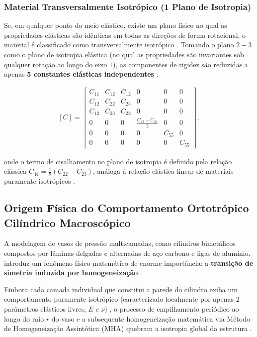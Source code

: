 \subsubsection{Material Transversalmente Isotrópico (1 Plano de Isotropia)}
Se, em qualquer ponto do meio elástico, existe um plano físico no qual as propriedades elásticas são idênticas em todas as direções de forma rotacional, o material é classificado como transversalmente isotrópico \cite{lai2010continuum}. Tomando o plano $2-3$ como o plano de isotropia elástica (no qual as propriedades são invariantes sob qualquer rotação ao longo do eixo $1$), as componentes de rigidez são reduzidas a apenas \textbf{5 constantes elásticas independentes} \cite{lai2010continuum}:

\begin{equation}
  \begin{aligned}
    [C] = \begin{bmatrix}
  C_{11} & C_{12} & C_{12} & 0 & 0 & 0 \\
  C_{12} & C_{22} & C_{23} & 0 & 0 & 0 \\
  C_{12} & C_{23} & C_{22} & 0 & 0 & 0 \\
  0 & 0 & 0 & \frac{C_{22} - C_{23}}{2} & 0 & 0\\
  0 & 0 & 0 & 0 & C_{55} & 0\\
  0 & 0 & 0 & 0 & 0 & C_{55}
  \end{bmatrix},
  \end{aligned}
  \label{eq:transverse_isotropic_stiffness}
\end{equation}

onde o termo de cisalhamento no plano de isotropia é definido pela relação clássica $C_{44} = \frac{1}{2}(C_{22} - C_{23})$, análoga à relação elástica linear de materiais puramente isotrópicos \cite{Sadd2009}.

\subsection{Origem Física do Comportamento Ortotrópico Cilíndrico Macroscópico}

A modelagem de vasos de pressão multicamadas, como cilindros bimetálicos compostos por lâminas delgadas e alternadas de aço carbono e ligas de alumínio, introduz um fenômeno físico-matemático de enorme importância: a \textbf{transição de simetria induzida por homogeneização} \cite{bakhvalov1989}.

Embora cada camada individual que constitui a parede do cilindro exiba um comportamento puramente isotrópico (caracterizado localmente por apenas 2 parâmetros elásticos livres, $E$ e $\nu$) \cite{bakhvalov1989}, o processo de empilhamento periódico ao longo do raio $r$ do vaso e a subsequente homogeneização matemática via Método de Homogeneização Assintótica (MHA) quebram a isotropia global da estrutura \cite{PartonReport}.

